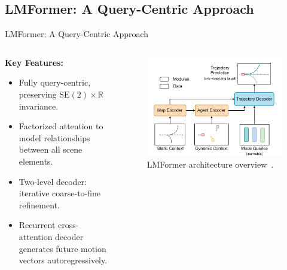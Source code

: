 \documentclass[10pt,aspectratio=169]{beamer}
\begin{document}


\subsection{LMFormer: A Query-Centric Approach}

\begin{frame}{LMFormer: A Query-Centric Approach}
    \begin{columns}[T]
        \begin{column}{0.5\textwidth}
            \textbf{Key Features:}
            \begin{itemize}
                \item Fully query-centric, preserving \(\mathrm{SE}(2) \times \mathbb{R}\) invariance.
                \item Factorized attention to model relationships between all scene elements.
                \item Two-level decoder: iterative coarse-to-fine refinement.
                \item Recurrent cross-attention decoder generates future motion vectors autoregressively.
            \end{itemize}
        \end{column}
        \begin{column}{0.5\textwidth}
            \begin{figure}
                \includegraphics[width=\textwidth]{docs/figures/lmformer_arch.png}
                \caption{LMFormer architecture overview~\cite{lmformerYadav2025}.}
            \end{figure}
        \end{column}
    \end{columns}
\end{frame}
\end{document}
